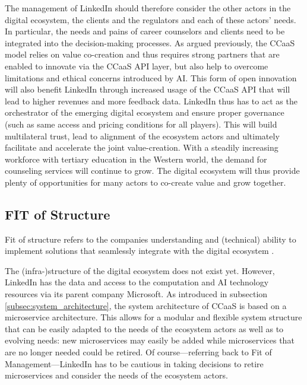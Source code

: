 The management of LinkedIn should therefore consider the other actors in the digital ecosystem, the clients 
and the regulators and each of these actors' needs.
In particular, the needs and pains of career counselors and clients need to be integrated into the decision-making
processes. As argued previously, the CCaaS model relies on value co-creation and thus requires strong 
partners that are enabled to innovate via the CCaaS API layer, but also help to overcome limitations and ethical 
concerns introduced by AI. This form of open innovation will also 
benefit LinkedIn through increased usage of the CCaaS API that will lead to higher revenues and more
feedback data. LinkedIn thus has to act as the orchestrator of the emerging digital ecosystem and
ensure proper governance (such as same access and pricing conditions for all players). This will build
multilateral trust, lead to alignment of the ecosystem actors and ultimately facilitate and accelerate
the joint value-creation. With a steadily increasing workforce with tertiary education in the Western
world, the demand for counseling services will continue to grow. The digital ecosystem will thus 
provide plenty of opportunities for many actors to co-create value and grow together.


\subsection{FIT of Structure}

Fit of structure refers to the companies understanding and (technical) ability to implement solutions
that seamlessly integrate with the digital ecosystem \citep[p.~53]{griederDigitalEcosystemHow2019}. 

The (infra-)structure of the digital ecosystem does not exist yet. However, LinkedIn has the
data and access to the computation and AI technology resources via its parent company Microsoft. As
introduced in subsection \ref{subsec:system_architecture}, the system architecture of CCaaS is based 
on a microservice architecture. This allows for a modular and flexible system structure that can be
easily adapted to the needs of the ecosystem actors as well as to evolving needs: new microservices 
may easily be added while microservices that are no longer needed could be retired. Of course---referring 
back to Fit of Management---LinkedIn has to be cautious in taking decisions to retire microservices 
and consider the needs of the ecosystem actors.

